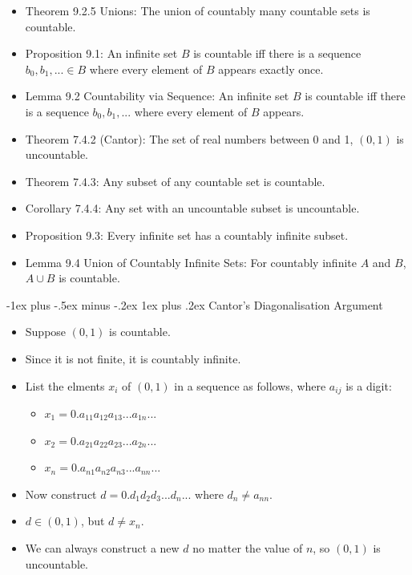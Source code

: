 \documentclass[10pt, portrait]{article}
\makeatletter
\renewcommand{\subsection}{\@startsection{subsection}{3}{0mm}%
                                {-1ex plus -.5ex minus -.2ex}%
                                {1ex plus .2ex}%
                                {\normalfont\small\bfseries}}%
\makeatother
\begin{document}
\begin{multicols*}{2}
\begin{itemize}
    \item Theorem 9.2.5 Unions: The union of countably many countable sets is countable.
    \item Proposition 9.1: An infinite set $B$ is countable iff there is a sequence $b_0, b_1, ... \in B$ where every element of $B$ appears exactly once.
    \item Lemma 9.2 Countability via Sequence: An infinite set $B$ is countable iff there is a sequence $b_0, b_1, ...$ where every element of $B$ appears.
    \item Theorem 7.4.2 (Cantor): The set of real numbers between 0 and 1, $(0, 1)$ is uncountable.
    \item Theorem 7.4.3: Any subset of any countable set is countable.
    \item Corollary 7.4.4: Any set with an uncountable subset is uncountable.
    \item Proposition 9.3: Every infinite set has a countably infinite subset.
    \item Lemma 9.4 Union of Countably Infinite Sets: For countably infinite $A$ and $B$, $A \cup B$ is countable.
\end{itemize}

\subsection{Cantor's Diagonalisation Argument}
\begin{itemize}
    \item Suppose $(0, 1)$ is countable.
    \item Since it is not finite, it is countably infinite.
    \item List the elments $x_i$ of $(0, 1)$ in a sequence as follows, where $a_{ij}$ is a digit:
    \begin{itemize}
        \item $x_1 = 0.a_{11}a_{12}a_{13}...a_{1n}...$
        \item $x_2 = 0.a_{21}a_{22}a_{23}...a_{2n}...$
        \item $x_n = 0.a_{n1}a_{n2}a_{n3}...a_{nn}...$
    \end{itemize}
    \item Now construct $d = 0.d_1d_2d_3...d_n...$ where $d_n \neq a_{nn}$.
    \item $d \in (0, 1)$, but $d \neq x_n$.
    \item We can always construct a new $d$ no matter the value of $n$, so $(0, 1)$ is uncountable.
\end{itemize}


\end{multicols*}
\end{document}
